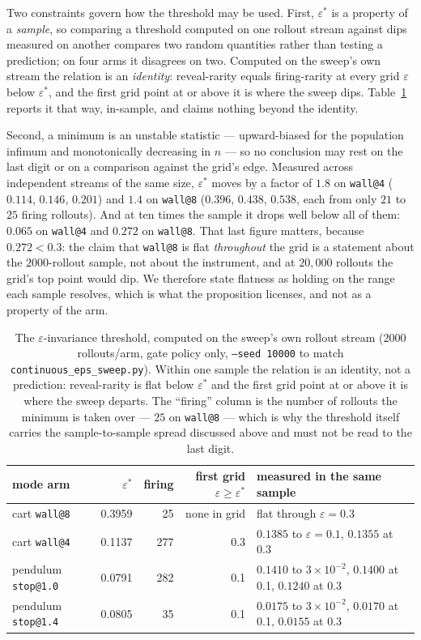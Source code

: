 \documentclass[11pt]{article}
\theoremstyle{definition}
\theoremstyle{remark}
\begin{document}
Two constraints govern how the threshold may be used. First, $\varepsilon^\ast$ is a property of a \emph{sample}, so comparing a threshold computed on one rollout stream against dips measured on another compares two random quantities rather than testing a prediction; on four arms it disagrees on two. Computed on the sweep's own stream the relation is an \emph{identity}: reveal-rarity equals firing-rarity at every grid $\varepsilon$ below $\varepsilon^\ast$, and the first grid point at or above it is where the sweep dips. Table~\ref{tab:epsstar} reports it that way, in-sample, and claims nothing beyond the identity.

Second, a minimum is an unstable statistic --- upward-biased for the population infimum and monotonically decreasing in $n$ --- so no conclusion may rest on the last digit or on a comparison against the grid's edge. Measured across independent streams of the same size, $\varepsilon^\ast$ moves by a factor of $1.8$ on \texttt{wall@4} ($0.114$, $0.146$, $0.201$) and $1.4$ on \texttt{wall@8} ($0.396$, $0.438$, $0.538$, each from only $21$ to $25$ firing rollouts). And at ten times the sample it drops well below all of them: $0.065$ on \texttt{wall@4} and $0.272$ on \texttt{wall@8}. That last figure matters, because $0.272 < 0.3$: the claim that \texttt{wall@8} is flat \emph{throughout} the grid is a statement about the $2000$-rollout sample, not about the instrument, and at $20{,}000$ rollouts the grid's top point would dip. We therefore state flatness as holding on the range each sample resolves, which is what the proposition licenses, and not as a property of the arm.

\begin{table}[ht]
\centering
\small
\begin{tabular}{lrrrl}
\toprule
mode arm & $\varepsilon^\ast$ & firing & first grid $\varepsilon \geq \varepsilon^\ast$ & measured in the same sample \\
\midrule
cart \texttt{wall@8} & 0.3959 & 25 & none in grid & flat through $\varepsilon = 0.3$ \\
cart \texttt{wall@4} & 0.1137 & 277 & 0.3 & $0.1385$ to $\varepsilon = 0.1$, $0.1355$ at 0.3 \\
pendulum \texttt{stop@1.0} & 0.0791 & 282 & 0.1 & $0.1410$ to $3{\times}10^{-2}$, $0.1400$ at 0.1, $0.1240$ at 0.3 \\
pendulum \texttt{stop@1.4} & 0.0805 & 35 & 0.1 & $0.0175$ to $3{\times}10^{-2}$, $0.0170$ at 0.1, $0.0155$ at 0.3 \\
\bottomrule
\end{tabular}
\caption{The $\varepsilon$-invariance threshold, computed on the sweep's own rollout stream (2000 rollouts/arm, gate policy only, \texttt{--seed 10000} to match \texttt{continuous\_eps\_sweep.py}). Within one sample the relation is an identity, not a prediction: reveal-rarity is flat below $\varepsilon^\ast$ and the first grid point at or above it is where the sweep departs. The ``firing'' column is the number of rollouts the minimum is taken over --- $25$ on \texttt{wall@8} --- which is why the threshold itself carries the sample-to-sample spread discussed above and must not be read to the last digit.}
\label{tab:epsstar}
\end{table}
\end{document}
